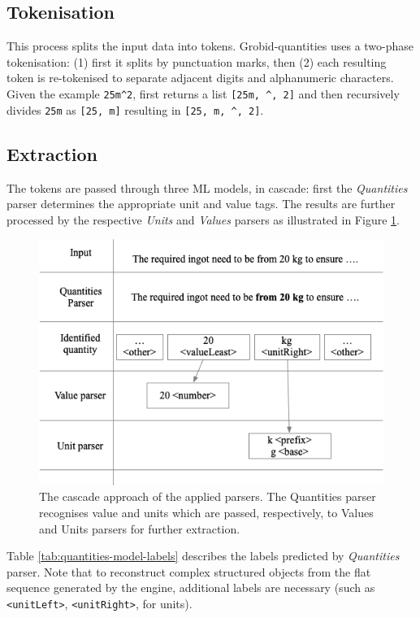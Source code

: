 \subsection{Tokenisation}
This process splits the input data into tokens. Grobid-quantities uses a two-phase tokenisation: (1) first it splits by punctuation marks, then (2) each resulting token is re-tokenised to separate adjacent digits and alphanumeric characters. Given the example \texttt{25m\^{}2}, first returns a list \texttt{[25m, \^{}, 2]} and then recursively divides \texttt{25m} as \texttt{[25, m]}  resulting in \texttt{[25, m, \^{}, 2]}.

\subsection{Extraction}
The tokens are passed through three ML models, in cascade: first the \textit{Quantities} parser determines the appropriate unit and value tags. The results are further processed by the respective \textit{Units} and \textit{Values} parsers as illustrated in Figure \ref{fig:schema-cascade}.  

\begin{figure}[htbp]
  \centering
  \includegraphics[width=\linewidth]{figures/quantities/schema-cascade}
  \caption{The cascade approach of the applied parsers. The Quantities parser recognises value and units which are passed, respectively, to Values and Units parsers for further extraction.}
  \label{fig:schema-cascade}
\end{figure}

Table \ref{tab:quantities-model-labels} describes the labels predicted by \textit{Quantities} parser. Note that to reconstruct complex structured objects from the flat sequence generated by the engine, additional labels are necessary (such as \texttt{<unitLeft>}, \texttt{<unitRight>}, for units).

